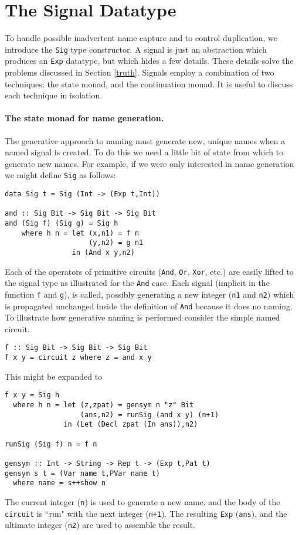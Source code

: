 \documentclass[10pt,twoside]{article}
\begin{document}
\section{The Signal Datatype}\label{implement}
To handle possible inadvertent name capture and to control duplication, we
introduce the {\tt Sig} type constructor. A signal is just an abstraction
which produces an {\tt Exp} datatype, but which hides a few details. These
details solve the problems discussed in Section \ref{truth}.
Signals employ a combination of two techniques: the state monad, and the
continuation monad. It is useful to discuss each technique in isolation.

\paragraph{The state monad for name generation.} The generative approach
to naming must generate new, unique names when a named signal is created.
To do this we need a little bit of state from which to generate new names.
For example, if we were only interested in name generation we might
define {\tt Sig} as follows:
\begin{verbatim}
data Sig t = Sig (Int -> (Exp t,Int))

and :: Sig Bit -> Sig Bit -> Sig Bit
and (Sig f) (Sig g) = Sig h  
    where h n = let (x,n1) = f n
                    (y,n2) = g n1
                in (And x y,n2)
\end{verbatim}
Each of the operators of primitive circuits ({\tt And}, {\tt Or}, {\tt Xor}, etc.)
are easily lifted to the signal type as illustrated for the {\tt And}
case. Each signal (implicit in the function {\tt f} and {\tt g}), is
called, possibly generating a new integer ({\tt n1} and {\tt n2}) which
is propagated unchanged inside the definition of {\tt And} because it
does no naming. To illustrate how generative naming is performed
consider the simple named circuit.
\begin{verbatim}
f :: Sig Bit -> Sig Bit -> Sig Bit
f x y = circuit z where z = and x y
\end{verbatim}
This might be expanded to 
\begin{verbatim}
f x y = Sig h
  where h n = let (z,zpat) = gensym n "z" Bit
                  (ans,n2) = runSig (and x y) (n+1)
              in (Let (Decl zpat (In ans)),n2)
                            
runSig (Sig f) n = f n

gensym :: Int -> String -> Rep t -> (Exp t,Pat t)
gensym s t = (Var name t,PVar name t)
  where name = s++show n              
\end{verbatim}
The current integer ({\tt n}) is used to generate a new name, and the
body of the {\tt circuit} is ``run" with the next integer ({\tt n+1}). The resulting
{\tt Exp} ({\tt ans}), and the ultimate integer ({\tt n2}) are used
to assemble the result.
\end{document}
